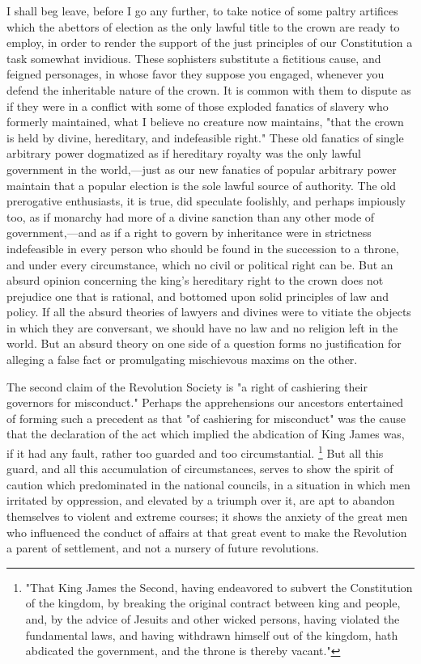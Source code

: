 I shall beg leave, before I go any further, to take notice of some paltry artifices which the abettors of election as the only lawful title to the crown are ready to employ, in order to render the support of the just principles of our Constitution a task somewhat invidious. These sophisters substitute a fictitious cause, and feigned personages, in whose favor they suppose you engaged, whenever you defend the inheritable nature of the crown. It is common with them to dispute as if they were in a conflict with some of those exploded fanatics of slavery who formerly maintained, what I believe no creature now maintains, "that the crown is held by divine, hereditary, and indefeasible right." These old fanatics of single arbitrary power dogmatized as if hereditary royalty was the only lawful government in the world,—just as our new fanatics of popular arbitrary power maintain that a popular election is the sole lawful source of authority. The old prerogative enthusiasts, it is true, did speculate foolishly, and perhaps impiously too, as if monarchy had more of a divine sanction than any other mode of government,—and as if a right to govern by inheritance were in strictness indefeasible in every person who should be found in the succession to a throne, and under every circumstance, which no civil or political right can be. But an absurd opinion concerning the king's hereditary right to the crown does not prejudice one that is rational, and bottomed upon solid principles of law and policy. If all the absurd theories of lawyers and divines were to vitiate the objects in which they are conversant, we should have no law and no religion left in the world. But an absurd theory on one side of a question forms no justification for alleging a false fact or promulgating mischievous maxims on the other.

The second claim of the Revolution Society is "a right of cashiering their governors for misconduct." Perhaps the apprehensions our ancestors entertained of forming such a precedent as that "of cashiering for misconduct" was the cause that the declaration of the act which implied the abdication of King James was, if it had any fault, rather too guarded and too circumstantial.
\footnote{ "That King James the Second, having endeavored to subvert the Constitution of the kingdom, by breaking the original contract between king and people, and, by the advice of Jesuits and other wicked persons, having violated the fundamental laws, and having withdrawn himself out of the kingdom, hath abdicated the government, and the throne is thereby vacant."}
 But all this guard, and all this accumulation of circumstances, serves to show the spirit of caution which predominated in the national councils, in a situation in which men irritated by oppression, and elevated by a triumph over it, are apt to abandon themselves to violent and extreme courses; it shows the anxiety of the great men who influenced the conduct of affairs at that great event to make the Revolution a parent of settlement, and not a nursery of future revolutions.

